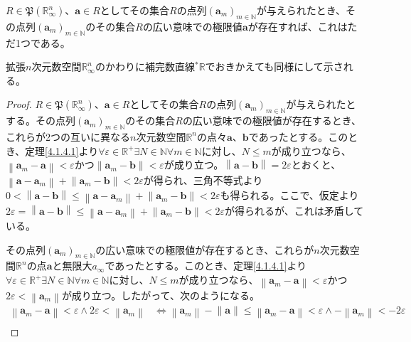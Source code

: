 \documentclass[dvipdfmx]{jsarticle}
\begin{document}
\begin{thm}\label{4.1.4.2}
$R \in \mathfrak{P}\left( \mathbb{R}_{\infty}^{n} \right)$、$\mathbf{a} \in R$としてその集合$R$の点列$\left( \mathbf{a}_{m} \right)_{m \in \mathbb{N}}$が与えられたとき、その点列$\left( \mathbf{a}_{m} \right)_{m \in \mathbb{N}}$のその集合$R$の広い意味での極限値$\mathbf{a}$が存在すれば、これはただ1つである。\par
拡張$n$次元数空間$\mathbb{R}_{\infty}^{n}$のかわりに補完数直線${}^{*}\mathbb{R}$でおきかえても同様にして示される。
\end{thm}
\begin{proof}
$R \in \mathfrak{P}\left( \mathbb{R}_{\infty}^{n} \right)$、$\mathbf{a} \in R$としてその集合$R$の点列$\left( \mathbf{a}_{m} \right)_{m \in \mathbb{N}}$が与えられたとする。その点列$\left( \mathbf{a}_{m} \right)_{m \in \mathbb{N}}$のその集合$R$の広い意味での極限値が存在するとき、これらが2つの互いに異なる$n$次元数空間$\mathbb{R}^{n}$の点々$\mathbf{a}$、$\mathbf{b}$であったとする。このとき、定理\ref{4.1.4.1}より$\forall\varepsilon \in \mathbb{R}^{+}\exists N \in \mathbb{N}\forall m \in \mathbb{N}$に対し、$N \leq m$が成り立つなら、$\left\| \mathbf{a}_{m} - \mathbf{a} \right\| < \varepsilon$かつ$\left\| \mathbf{a}_{m} - \mathbf{b} \right\| < \varepsilon$が成り立つ。$\left\| \mathbf{a - b} \right\| = 2\varepsilon$とおくと、$\left\| \mathbf{a} - \mathbf{a}_{m} \right\| + \left\| \mathbf{a}_{m} - \mathbf{b} \right\| < 2\varepsilon$が得られ、三角不等式より$0 < \left\| \mathbf{a - b} \right\| \leq \left\| \mathbf{a} - \mathbf{a}_{m} \right\| + \left\| \mathbf{a}_{m} - \mathbf{b} \right\| < 2\varepsilon$も得られる。ここで、仮定より$2\varepsilon = \left\| \mathbf{a - b} \right\| \leq \left\| \mathbf{a} - \mathbf{a}_{m} \right\| + \left\| \mathbf{a}_{m} - \mathbf{b} \right\| < 2\varepsilon$が得られるが、これは矛盾している。\par
その点列$\left( \mathbf{a}_{m} \right)_{m \in \mathbb{N}}$の広い意味での極限値が存在するとき、これらが$n$次元数空間$\mathbb{R}^{n}$の点$\mathbf{a}$と無限大$a_{\infty}$であったとする。このとき、定理\ref{4.1.4.1}より$\forall\varepsilon \in \mathbb{R}^{+}\exists N \in \mathbb{N}\forall m \in \mathbb{N}$に対し、$N \leq m$が成り立つなら、$\left\| \mathbf{a}_{m} - \mathbf{a} \right\| < \varepsilon$かつ$2\varepsilon < \left\| \mathbf{a}_{m} \right\|$が成り立つ。したがって、次のようになる。
\begin{align*}
\left\| \mathbf{a}_{m} - \mathbf{a} \right\| < \varepsilon \land 2\varepsilon < \left\| \mathbf{a}_{m} \right\| &\Leftrightarrow \left\| \mathbf{a}_{m} \right\| - \left\| \mathbf{a} \right\| \leq \left\| \mathbf{a}_{m} - \mathbf{a} \right\| < \varepsilon \land - \left\| \mathbf{a}_{m} \right\| < - 2\varepsilon\\

\end{align*}
\end{proof}
\end{document}
